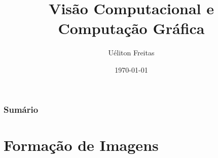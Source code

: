 \documentclass{beamer}
\title[Computação Gráfica]{Visão Computacional e Computação Gráfica} %
\author{Uéliton Freitas} %
\institute[UFMS] %
{
Universidade Católica Don Bosco - UCDB \\ %
\medskip
\textit{freitas.ueliton@gmail.com} %
}
\date{\today} %
\begin{document}
\begin{frame}
\titlepage %
\end{frame}

\begin{frame}
\frametitle{Sumário} %
\tableofcontents %
\end{frame}





\section{Formação de Imagens} 



\end{document}
